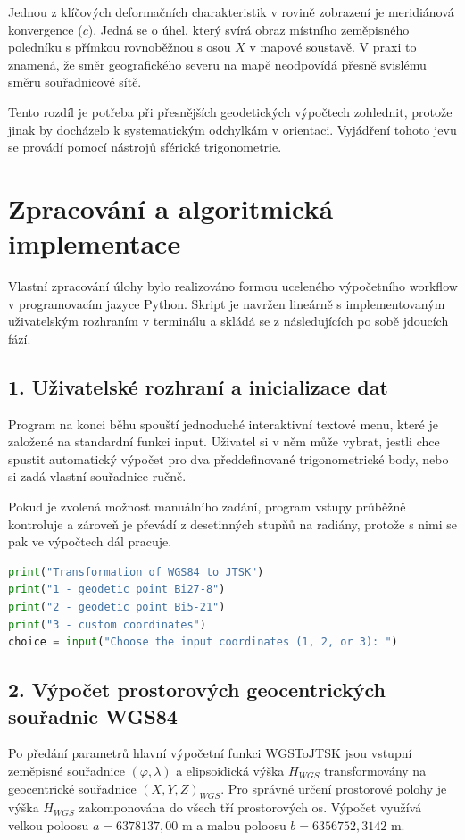 Jednou z klíčových deformačních charakteristik v rovině zobrazení je meridiánová konvergence ($c$). Jedná se o úhel, který svírá obraz místního zeměpisného poledníku s přímkou rovnoběžnou s osou $X$ v mapové soustavě. V praxi to znamená, že směr geografického severu na mapě neodpovídá přesně svislému směru souřadnicové sítě.

Tento rozdíl je potřeba při přesnějších geodetických výpočtech zohlednit, protože jinak by docházelo k systematickým odchylkám v orientaci. Vyjádření tohoto jevu se provádí pomocí nástrojů sférické trigonometrie.

\newpage
\section*{Zpracování a algoritmická implementace}
Vlastní zpracování úlohy bylo realizováno formou uceleného výpočetního workflow v programovacím jazyce Python. Skript je navržen lineárně s implementovaným uživatelským rozhraním v terminálu a skládá se z následujících po sobě jdoucích fází.

\subsection*{1. Uživatelské rozhraní a inicializace dat}
Program na konci běhu spouští jednoduché interaktivní textové menu, které je založené na standardní funkci input. Uživatel si v něm může vybrat, jestli chce spustit automatický výpočet pro dva předdefinované trigonometrické body, nebo si zadá vlastní souřadnice ručně.

Pokud je zvolená možnost manuálního zadání, program vstupy průběžně kontroluje a zároveň je převádí z desetinných stupňů na radiány, protože s nimi se pak ve výpočtech dál pracuje.

\begin{lstlisting}[language=Python, caption={Řídicí struktura interaktivního výběru skriptu.}]
print("Transformation of WGS84 to JTSK")
print("1 - geodetic point Bi27-8")
print("2 - geodetic point Bi5-21")
print("3 - custom coordinates")
choice = input("Choose the input coordinates (1, 2, or 3): ")
\end{lstlisting}

\subsection*{2. Výpočet prostorových geocentrických souřadnic WGS84}
Po předání parametrů hlavní výpočetní funkci WGSToJTSK jsou vstupní zeměpisné souřadnice $(\varphi, \lambda)$ a elipsoidická výška $H_{WGS}$ transformovány na geocentrické souřadnice $(X, Y, Z)_{WGS}$. Pro správné určení prostorové polohy je výška $H_{WGS}$ zakomponována do všech tří prostorových os. Výpočet využívá velkou poloosu $a = 6378137,00\text{ m}$ a malou poloosu $b = 6356752,3142\text{ m}$.

